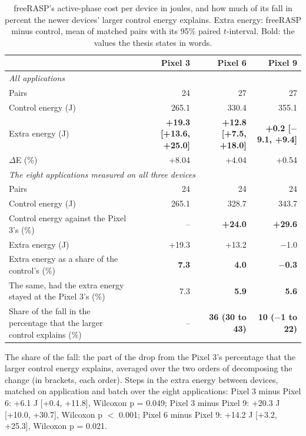 \begin{table}[t]
\centering
\small
\caption{freeRASP's active-phase cost per device in joules, and how much of its fall in percent the newer devices' larger control energy explains. Extra energy: freeRASP minus control, mean of matched pairs with its 95\% paired $t$-interval. Bold: the values the thesis states in words.}
\label{tab:freerasp-active-cost}
\begin{tabular}{lrrr}
\toprule
\textbf{} & \textbf{Pixel 3} & \textbf{Pixel 6} & \textbf{Pixel 9} \\
\midrule
\multicolumn{4}{l}{\textit{All applications}} \\
Pairs & 24 & 27 & 27 \\
Control energy (J) & 265.1 & 330.4 & 355.1 \\
Extra energy (J) & \textbf{+19.3 [+13.6, +25.0]} & \textbf{+12.8 [+7.5, +18.0]} & \textbf{+0.2 [$-$9.1, +9.4]} \\
$\Delta$E (\%) & +8.04 & +4.04 & +0.54 \\
\midrule
\multicolumn{4}{l}{\textit{The eight applications measured on all three devices}} \\
Pairs & 24 & 24 & 24 \\
Control energy (J) & 265.1 & 328.7 & 343.7 \\
Control energy against the Pixel 3's (\%) & – & \textbf{+24.0} & \textbf{+29.6} \\
Extra energy (J) & +19.3 & +13.2 & $-$1.0 \\
Extra energy as a share of the control's (\%) & \textbf{7.3} & \textbf{4.0} & \textbf{$-$0.3} \\
The same, had the extra energy stayed at the Pixel 3's (\%) & 7.3 & \textbf{5.9} & \textbf{5.6} \\
Share of the fall in the percentage that the larger control explains (\%) & – & \textbf{36 (30 to 43)} & \textbf{10 ($-$1 to 22)} \\
\bottomrule
\end{tabular}
\par\smallskip\footnotesize The share of the fall: the part of the drop from the Pixel 3's percentage that the larger control energy explains, averaged over the two orders of decomposing the change (in brackets, each order). Steps in the extra energy between devices, matched on application and batch over the eight applications: Pixel 3 minus Pixel 6: +6.1 J [+0.4, +11.8], Wilcoxon p = 0.049; Pixel 3 minus Pixel 9: +20.3 J [+10.0, +30.7], Wilcoxon p $<$ 0.001; Pixel 6 minus Pixel 9: +14.2 J [+3.2, +25.3], Wilcoxon p = 0.021.
\end{table}
